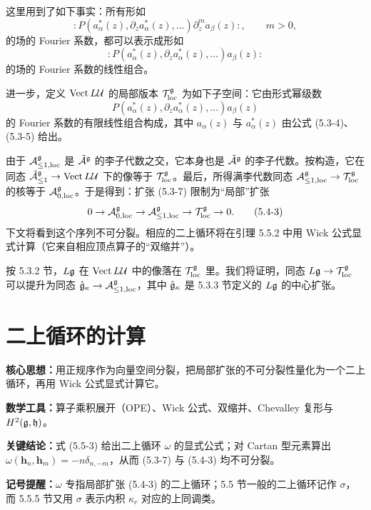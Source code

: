 这里用到了如下事实：所有形如
\[
{:}P(a^*_\alpha(z),\partial_z a^*_\alpha(z),\dots)\partial_z^m a_\beta(z){:},\qquad m>0,
\]
的场的 Fourier 系数，都可以表示成形如
\begin{equation}
{:}P(a^*_\alpha(z),\partial_z a^*_\alpha(z),\dots)a_\beta(z){:}
\tag{5.4-1}
\end{equation}
的场的 Fourier 系数的线性组合。

进一步，定义 $\operatorname{Vect} L\mathcal{U}$ 的局部版本 $\mathcal{T}^{\mathfrak{g}}_{\mathrm{loc}}$ 为如下子空间：它由形式幂级数
\begin{equation}
P(a^*_\alpha(z),\partial_z a^*_\alpha(z),\dots)a_\beta(z)
\tag{5.4-2}
\end{equation}
的 Fourier 系数的有限线性组合构成，其中 $a_\alpha(z)$ 与 $a^*_\alpha(z)$ 由公式 (5.3-4)、(5.3-5) 给出。

由于 $\mathcal{A}^{\mathfrak{g}}_{\le1,\mathrm{loc}}$ 是 $\tilde{\mathcal{A}}^{\mathfrak{g}}$ 的李子代数之交，它本身也是 $\tilde{\mathcal{A}}^{\mathfrak{g}}$ 的李子代数。按构造，它在同态 $\tilde{\mathcal{A}}^{\mathfrak{g}}_{\le1}\to\operatorname{Vect} L\mathcal{U}$ 下的像等于 $\mathcal{T}^{\mathfrak{g}}_{\mathrm{loc}}$。最后，所得满李代数同态 $\mathcal{A}^{\mathfrak{g}}_{\le1,\mathrm{loc}}\to\mathcal{T}^{\mathfrak{g}}_{\mathrm{loc}}$ 的核等于 $\mathcal{A}^{\mathfrak{g}}_{0,\mathrm{loc}}$。于是得到：扩张 (5.3-7) 限制为“局部”扩张
\begin{equation}
0 \to \mathcal{A}^{\mathfrak{g}}_{0,\mathrm{loc}} \to \mathcal{A}^{\mathfrak{g}}_{\le1,\mathrm{loc}} \to \mathcal{T}^{\mathfrak{g}}_{\mathrm{loc}} \to 0.
\tag{5.4-3}
\end{equation}
下文将看到这个序列不可分裂。相应的二上循环将在引理 5.5.2 中用 Wick 公式显式计算（它来自相应顶点算子的“双缩并”）。

按 5.3.2 节，$L\mathfrak{g}$ 在 $\operatorname{Vect} L\mathcal{U}$ 中的像落在 $\mathcal{T}^{\mathfrak{g}}_{\mathrm{loc}}$ 里。我们将证明，同态 $L\mathfrak{g}\to\mathcal{T}^{\mathfrak{g}}_{\mathrm{loc}}$ 可以提升为同态 $\hat{\mathfrak{g}}_\kappa\to\mathcal{A}^{\mathfrak{g}}_{\le1,\mathrm{loc}}$，其中 $\hat{\mathfrak{g}}_\kappa$ 是 5.3.3 节定义的 $L\mathfrak{g}$ 的中心扩张。


\section{二上循环的计算}

\begin{keypoints}
    \item \textbf{核心思想：}用正规序作为向量空间分裂，把局部扩张的不可分裂性量化为一个二上循环，再用 Wick 公式显式计算它。
    \item \textbf{数学工具：}算子乘积展开（OPE）、Wick 公式、双缩并、Chevalley 复形与 $H^2(\mathfrak{g},\mathfrak{h})$。
    \item \textbf{关键结论：}式 (5.5-3) 给出二上循环 $\omega$ 的显式公式；对 Cartan 型元素算出 $\omega(\mathbf{h}_n,\mathbf{h}_m) = -n\delta_{n,-m}$，从而 (5.3-7) 与 (5.4-3) 均不可分裂。
    \item \textbf{记号提醒：}$\omega$ 专指局部扩张 (5.4-3) 的二上循环；5.5 节一般的二上循环记作 $\sigma$，而 5.5.5 节又用 $\sigma$ 表示内积 $\kappa_c$ 对应的上同调类。
\end{keypoints}

